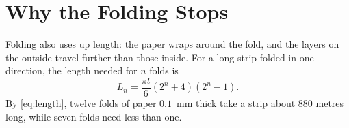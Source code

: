 \documentclass[11pt]{article}
\begin{document}
\section{Why the Folding Stops}
Folding also uses up length: the paper wraps around the fold, and the layers on the outside
travel further than those inside. For a long strip folded in one direction, the length
needed for $n$ folds is~\cite{gallivan2002}
\begin{equation}
  L_n = \frac{\pi t}{6} \left(2^n + 4\right)\left(2^n - 1\right).
  \label{eq:length}
\end{equation}
By \eqref{eq:length}, twelve folds of paper $0.1$~mm thick take a strip about 880 metres
long, while seven folds need less than one.



\end{document}
